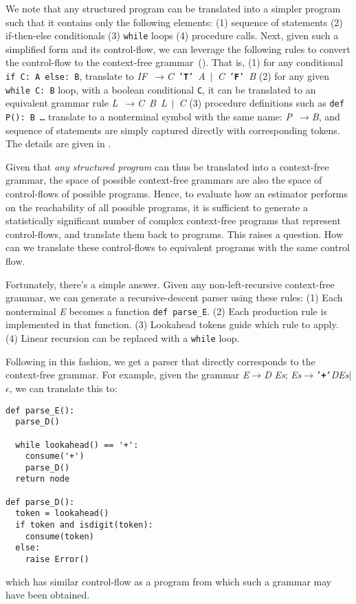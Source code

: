 \documentclass[conference,anonymous,review]{IEEEtran}
\def\<#1>{\texttt{#1}}
\def\term#1{\texttt{'\textbf{#1}'}}
\def\nonterm#1{\textlangle\textnormal{\emph{#1}}\textrangle}
\def\expandsto{\(\rightarrow{}\)}
\begin{document}
We note that any structured program can be translated into a simpler program
such that it contains only the following elements:
(1) sequence of statements
(2) if-then-else conditionals
(3) \<while> loops
(4) procedure calls.
Next, given such a simplified form and its control-flow,
we can leverage the following rules to convert the control-flow to the context-free grammar~().
That is,
(1) for any conditional \<if C: A else: B>, translate to
  \mbox{\nonterm{IF} \expandsto \nonterm{C} \term{T} \nonterm{A}  $|$ \nonterm{C} \term{F} \nonterm{B}}
(2) for any given \<while C: B> loop, with a boolean conditional \<C>,
it can be translated to an equivalent grammar rule
\mbox{\nonterm{L} \expandsto \nonterm{C} \nonterm{B} \nonterm{L} $|$ \nonterm{C}}
(3) procedure definitions such as \<def P(): B \ldots> translate to a nonterminal symbol with the same
name: \mbox{\nonterm{P} \expandsto \nonterm{B}}, and sequence of statements are simply captured
directly with corresponding tokens.
The details are given in .

Given that \emph{any structured program} can thus be translated into a
context-free grammar, the space of possible context-free grammars are also
the space of control-flows of possible programs. Hence, to evaluate how
an estimator performs on the reachability of all possible programs, it is
sufficient to generate a statistically significant number of complex
context-free programs that represent control-flows, and translate them back
to programs. This raises a question. How can we translate these control-flows
to equivalent programs with the same control flow.

Fortunately, there's a simple answer. Given any non-left-recursive context-free
grammar, we can generate a recursive-descent parser using these rules:
(1) Each nonterminal \nonterm{E} becomes a function \<def parse\_E>.
(2) Each production rule is implemented in that function.
(3) Lookahead tokens guide which rule to apply.
(4) Linear recursion can be replaced with a \<while> loop.

Following in this fashion, we get a parser that directly corresponds to the context-free
grammar. For example, given the grammar 
\nonterm{E}\expandsto \nonterm{D} \nonterm{Es};
\nonterm{Es}\expandsto \term{+}\nonterm{D}\nonterm{Es}$|$ $\epsilon$, we can translate
this to:
\begin{lstlisting}[style=Python, escapechar=|,numbersep=2pt]
def parse_E():
  parse_D()

  while lookahead() == '+':
    consume('+')
    parse_D()
  return node

def parse_D():
  token = lookahead()
  if token and isdigit(token):
    consume(token)
  else:
    raise Error()
\end{lstlisting}
which has similar control-flow as a program from which such a grammar may have
been obtained.
\end{document}
